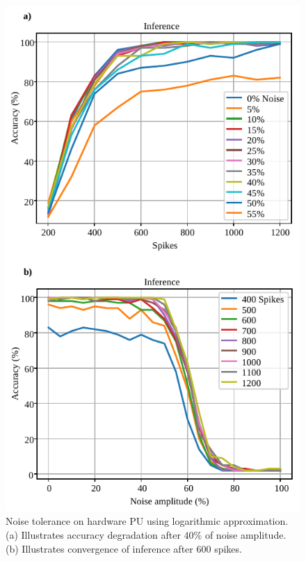 \begin{figure}[h!]
	\centering
	\includegraphics[width=1\columnwidth]{../figures/accuracy_vs_noise_pu_log.pdf}
	\caption{Noise tolerance on hardware PU using logarithmic approximation. (a) Illustrates accuracy degradation after $40\%$ of noise amplitude. (b) Illustrates convergence of inference after $600$ spikes.}
	\label{fig:accuracy_vs_noise_pu_log}
\end{figure}


